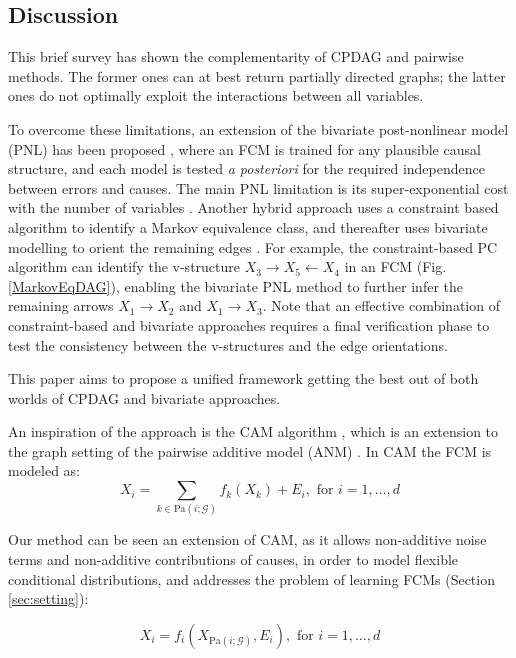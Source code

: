 \documentclass[a4paper, 11pt]{article}
\newcommand{\Pa}[1]{\text{Pa}({#1}; \mathcal{G})}
\begin{document}
\subsection{Discussion}
This brief survey has shown the complementarity of CPDAG and pairwise methods. The former ones can at best return partially directed graphs; the latter ones do not optimally exploit the interactions between all variables. 

To overcome these limitations, an extension of the bivariate post-nonlinear model (PNL) has been proposed \citep{zhang2009identifiability}, where an FCM is trained for any plausible causal structure, and each model is tested {\em a posteriori} for the required independence between errors and  causes. The main PNL limitation is its super-exponential cost with  the  number  of  variables \citep{zhang2009identifiability}. Another hybrid approach uses a constraint based algorithm to identify a Markov equivalence class, and thereafter uses bivariate modelling to orient the remaining  edges \citep{zhang2009identifiability}. For example, the constraint-based PC algorithm can identify the v-structure $X_3 \rightarrow X_5 \leftarrow X_4$ in an FCM (Fig. \ref{MarkovEqDAG}), enabling the bivariate PNL method to further infer the remaining arrows $X_1  \rightarrow X_2$ and $X_1 \rightarrow X_3$. Note that an effective combination of constraint-based and bivariate approaches requires a final verification phase to test the consistency between the  v-structures and the edge orientations.

This paper aims to propose a unified framework getting the best out of both worlds of CPDAG and bivariate approaches.

An inspiration of the approach is the CAM algorithm \citep{buhlmann2014cam}, which is an extension to the graph setting of the pairwise additive model (ANM) \citep{hoyer2009nonlinear}. In CAM the FCM is modeled as:
\begin{equation}
X_i = \sum_{k \in \Pa{i}} f_k(X_k) + E_i, \mbox{ for } i=1,\ldots, d
\label{eq:cam}
\end{equation}

Our method can be seen an extension of CAM, as it allows non-additive noise terms and non-additive contributions of causes, in order to model flexible conditional distributions, and addresses the problem of learning FCMs (Section \ref{sec:setting}):

\begin{equation}   {X}_i  = {f}_i({X}_{\Pa{i}}, {E}_i), \mbox{ for } i=1,\ldots, d
\end{equation}
\end{document}
